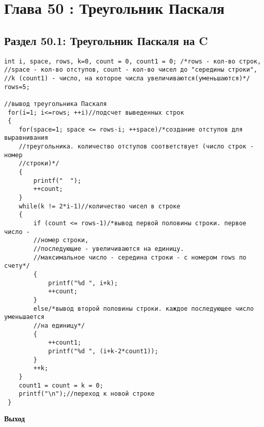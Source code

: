 
\chapter*{Глава 50 : Треугольник Паскаля}
\section*{Раздел 50.1: Треугольник Паскаля на C}
\begin{tcolorbox}\begin{verbatim}
int i, space, rows, k=0, count = 0, count1 = 0; /*rows - кол-во строк, 
//space - кол-во отступов, count - кол-во чисел до "середины строки",
//k (count1) - число, на которое числа увеличиваются(уменьшаются)*/
rows=5;

//вывод треугольника Паскаля
 for(i=1; i<=rows; ++i)//подсчет выведенных строк
 {
	for(space=1; space <= rows-i; ++space)/*создание отступов для выравнивания
	//треугольника. количество отступов соответствует (число строк - номер 
	//строки)*/
	{
		printf("  ");
		++count;
	}
	while(k != 2*i-1)//количество чисел в строке
	{
		if (count <= rows-1)/*вывод первой половины строки. первое число - 
		//номер строки, 
		//последующие - увеличиваются на единицу. 
		//максимальное число - середина строки - с номером rows по счету*/
		{
			printf("%d ", i+k);
			++count;
		}
		else/*вывод второй половины строки. каждое последующее число уменьшается 
		//на единицу*/
		{
			++count1;
			printf("%d ", (i+k-2*count1));
		}
		++k;
	}
	count1 = count = k = 0;
	printf("\n");//переход к новой строке
 }

\end{verbatim}
\end{tcolorbox}
\vspace{\baselineskip}

\textbf{Выход}
\vspace{\baselineskip}
\begin{tcolorbox}
{}

\end{tcolorbox}

